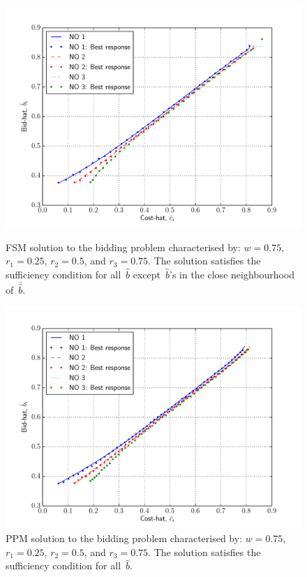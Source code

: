\begin{figure}[p!]
  \includegraphics[width=\figsize]{Indirect/Figures/forward_shooting_3_sufficiency}
  \caption{FSM solution to the bidding problem characterised by: $w=0.75$, $r_1 = 0.25$, $r_2 = 0.5$, and $r_3 = 0.75$. The solution satisfies the sufficiency condition for all~$\hat{b}$ except~$\hat{b}$'s in the close neighbourhood of~$\bar{\hat{b}}$.}
  \label{fig:forward_shooting_3_sufficiency_indirect}
  \vspace{10mm}
  \includegraphics[width=\figsize]{Indirect/Figures/polynomial_projection_3_sufficiency}
  \caption{PPM solution to the bidding problem characterised by: $w=0.75$, $r_1 = 0.25$, $r_2 = 0.5$, and $r_3 = 0.75$. The solution satisfies the sufficiency condition for all~$\hat{b}$.}
  \label{fig:polynomial_projection_3_sufficiency_indirect}
\end{figure}

